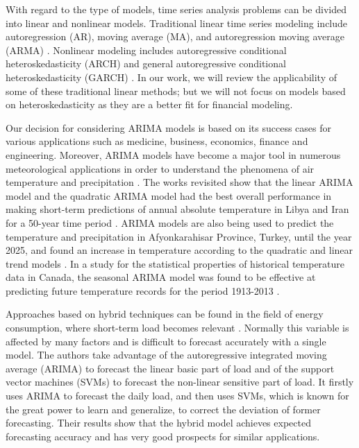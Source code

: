 With regard to the type of models, time series analysis problems can be divided into linear and nonlinear models. Traditional linear time series modeling include autoregression (AR), moving average (MA), and autoregression moving average (ARMA) \cite{Chatfield2001, Murat2018}. Nonlinear modeling includes autoregressive conditional heteroskedasticity (ARCH) \cite{Kirchgassner2008} and general autoregressive conditional heteroskedasticity (GARCH) \cite{Kirchgassner2008}. In our work, we will review the applicability of some of these traditional linear methods; but we will not focus on models based on heteroskedasticity as they are a better fit for financial modeling.

Our decision for considering ARIMA models is based on its success cases for various applications such as medicine, business, economics, finance and engineering. Moreover, ARIMA models have become a major tool in numerous meteorological applications in order to understand the phenomena of air temperature and precipitation \cite{Murat2018}. The works revisited show that the linear ARIMA model and the quadratic ARIMA model had the best overall performance in making short-term predictions of annual absolute temperature in Libya and Iran for a 50-year time period \cite{ElMallah2016}. ARIMA models are also being used to  predict the temperature and precipitation in Afyonkarahisar Province, Turkey, until the year 2025, and found an increase in temperature according to the quadratic and linear trend models \cite{Muhammet2012}. In a study for the statistical properties of historical temperature data in Canada, the seasonal ARIMA model was found to be effective at predicting future temperature records for the period 1913-2013 \cite{Khedhiri2016}.

Approaches based on hybrid techniques can be found in the field of energy consumption, where short-term  load becomes relevant \cite{Nie2012}. Normally this variable is affected by many factors and is difficult to forecast accurately with a single model. The authors take advantage of the autoregressive integrated moving average (ARIMA) to forecast the linear basic part of load and of the support vector machines (SVMs) to forecast the non-linear sensitive part of load. It firstly uses ARIMA to forecast the daily load, and then uses SVMs,  which  is  known  for  the  great  power  to  learn  and  generalize,  to  correct  the  deviation  of  former  forecasting. Their results show that the hybrid model achieves expected forecasting  accuracy and has very good prospects for similar applications.

